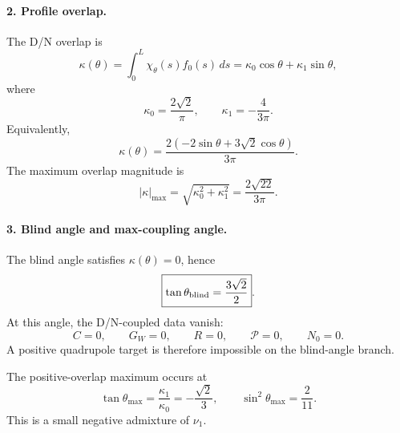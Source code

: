 \paragraph{2. Profile overlap.}
The D/N overlap is
\begin{equation}
\label{eq:app-stage027-kappa-theta}
\boxed{
\kappa(\theta)=\int_0^L\chi_\theta(s)f_0(s)\,ds
=\kappa_0\cos\theta+\kappa_1\sin\theta},
\end{equation}
where
\begin{equation}
\label{eq:app-stage027-kappa0-kappa1}
\boxed{
\kappa_0=\frac{2\sqrt2}{\pi},
\qquad
\kappa_1=-\frac{4}{3\pi}}.
\end{equation}
Equivalently,
\begin{equation}
\label{eq:app-stage027-kappa-explicit}
\kappa(\theta)=\frac{2(-2\sin\theta+3\sqrt2\cos\theta)}{3\pi}.
\end{equation}
The maximum overlap magnitude is
\begin{equation}
\label{eq:app-stage027-kappa-max}
\boxed{
|\kappa|_{\max}=\sqrt{\kappa_0^2+\kappa_1^2}=\frac{2\sqrt{22}}{3\pi}}.
\end{equation}

\paragraph{3. Blind angle and max-coupling angle.}
The blind angle satisfies \(\kappa(\theta)=0\), hence
\begin{equation}
\label{eq:app-stage027-blind-angle}
\boxed{
\tan\theta_{\rm blind}=\frac{3\sqrt2}{2}}.
\end{equation}
At this angle, the D/N-coupled data vanish:
\begin{equation}
C=0,
\qquad
G_W=0,
\qquad
R=0,
\qquad
\mathcal P=0,
\qquad
N_0=0.
\end{equation}
A positive quadrupole target is therefore impossible on the blind-angle branch.

The positive-overlap maximum occurs at
\begin{equation}
\label{eq:app-stage027-theta-max}
\boxed{
\tan\theta_{\max}=\frac{\kappa_1}{\kappa_0}=-\frac{\sqrt2}{3},
\qquad
\sin^2\theta_{\max}=\frac{2}{11}}.
\end{equation}
This is a small negative admixture of \(\nu_1\).

